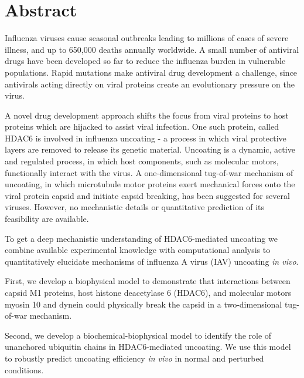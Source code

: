 \begingroup
\let\clearpage\relax
\let\cleardoublepage\relax
\let\cleardoublepage\relax

\chapter*{Abstract}

Influenza viruses cause seasonal outbreaks leading to millions of cases of severe illness, and up to 650,000 deaths annually worldwide. A small number of antiviral drugs have been developed so far to reduce the influenza burden in vulnerable populations. Rapid mutations make antiviral drug development a challenge, since antivirals acting directly on viral proteins create an evolutionary pressure on the virus.

A novel drug development approach shifts the focus from viral proteins to host proteins which are hijacked to assist viral infection. One such protein, called HDAC6 is involved in influenza uncoating - a process in which viral protective layers are removed to release its genetic material. Uncoating is a dynamic, active and regulated process, in which host components, such as molecular motors, functionally interact with the virus. A one-dimensional tug-of-war mechanism of uncoating, in which microtubule motor proteins exert mechanical forces onto the viral protein capsid and initiate capsid breaking, has been suggested for several viruses. However, no mechanistic details or quantitative prediction of its feasibility are available.

To get a deep mechanistic understanding of HDAC6-mediated uncoating we combine available experimental knowledge with computational analysis to quantitatively elucidate mechanisms of influenza A virus (IAV) uncoating \textit{in vivo}.

First, we develop a biophysical model to demonstrate that interactions between capsid M1 proteins, host histone deacetylase 6 (HDAC6), and molecular motors myosin 10 and dynein could physically break the capsid in a two-dimensional tug-of-war mechanism.

Second, we develop a biochemical-biophysical model to identify the role of unanchored ubiquitin chains in HDAC6-mediated uncoating. We use this model to robustly predict uncoating efficiency \textit{in vivo} in normal and perturbed conditions.

